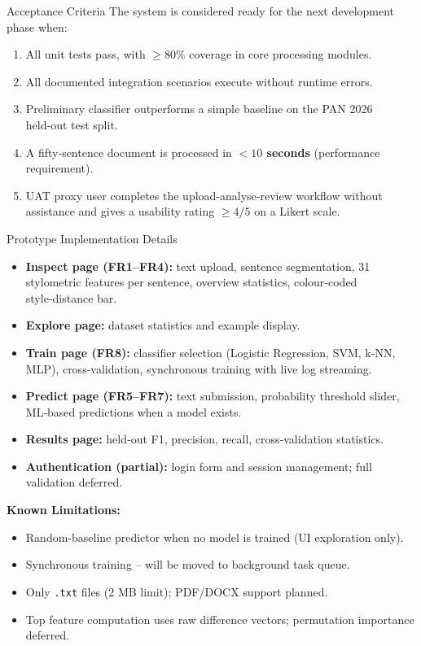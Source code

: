 \documentclass[compress,aspectratio=169]{beamer}
\begin{document}
\begin{frame}{Acceptance Criteria}
    The system is considered ready for the next development phase when:
    \begin{enumerate}
        \item All unit tests pass, with $\ge 80\%$ coverage in core processing modules.
        \item All documented integration scenarios execute without runtime errors.
        \item Preliminary classifier outperforms a simple baseline on the PAN 2026 held‑out test split.
        \item A fifty‑sentence document is processed in \textbf{$<10$ seconds} (performance requirement).
        \item UAT proxy user completes the upload‑analyse‑review workflow without assistance and gives a usability rating $\ge 4/5$ on a Likert scale.
    \end{enumerate}
\end{frame}

\begin{frame}{Prototype Implementation Details}
    \begin{itemize}
        \item \textbf{Inspect page (FR1–FR4):} text upload, sentence segmentation, 31 stylometric features per sentence, overview statistics, colour‑coded style‑distance bar.
        \item \textbf{Explore page:} dataset statistics and example display.
        \item \textbf{Train page (FR8):} classifier selection (Logistic Regression, SVM, k‑NN, MLP), cross‑validation, synchronous training with live log streaming.
        \item \textbf{Predict page (FR5–FR7):} text submission, probability threshold slider, ML‑based predictions when a model exists.
        \item \textbf{Results page:} held‑out F1, precision, recall, cross‑validation statistics.
        \item \textbf{Authentication (partial):} login form and session management; full validation deferred.
    \end{itemize}
    \vspace{0.3cm}
    \textbf{Known Limitations:}
    \begin{itemize}
        \item Random‑baseline predictor when no model is trained (UI exploration only).
        \item Synchronous training – will be moved to background task queue.
        \item Only \texttt{.txt} files (2 MB limit); PDF/DOCX support planned.
        \item Top feature computation uses raw difference vectors; permutation importance deferred.
    \end{itemize}
\end{frame}
\end{document}
